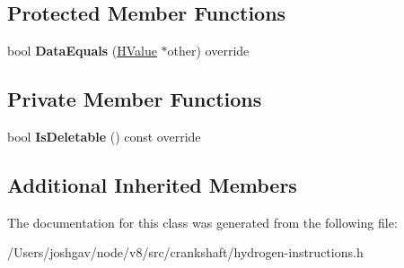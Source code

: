 \subsection*{Protected Member Functions}
\begin{DoxyCompactItemize}
\item 
bool {\bfseries Data\+Equals} (\hyperlink{classv8_1_1internal_1_1_h_value}{H\+Value} $\ast$other) override\hypertarget{classv8_1_1internal_1_1_h_context_a27fe81a4d40d42559b90a57cd986ef3c}{}\label{classv8_1_1internal_1_1_h_context_a27fe81a4d40d42559b90a57cd986ef3c}

\end{DoxyCompactItemize}
\subsection*{Private Member Functions}
\begin{DoxyCompactItemize}
\item 
bool {\bfseries Is\+Deletable} () const  override\hypertarget{classv8_1_1internal_1_1_h_context_a591332bd9a389c57434d7df49c2f1bb3}{}\label{classv8_1_1internal_1_1_h_context_a591332bd9a389c57434d7df49c2f1bb3}

\end{DoxyCompactItemize}
\subsection*{Additional Inherited Members}


The documentation for this class was generated from the following file\+:\begin{DoxyCompactItemize}
\item 
/\+Users/joshgav/node/v8/src/crankshaft/hydrogen-\/instructions.\+h\end{DoxyCompactItemize}
